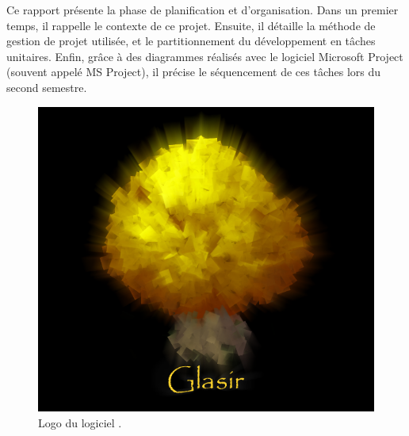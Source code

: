     Ce rapport présente la phase de planification et d'organisation. Dans un premier temps, il rappelle le contexte de ce projet. Ensuite, il détaille la méthode de gestion de projet utilisée, et le partitionnement du développement en tâches unitaires. Enfin, grâce à des diagrammes réalisés avec le logiciel Microsoft Project (souvent appelé MS Project), il précise le séquencement de ces tâches lors du second semestre.

    \begin{figure}[h!]
        \centering
        \includegraphics[height=0.4\textwidth]{figure/glasir.png}
        \caption{Logo du logiciel \glasir{}.}
        \label{fig:glasir}
    \end{figure}